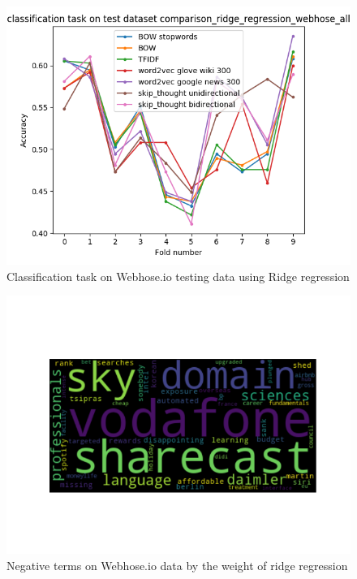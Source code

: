 \documentclass[sigconf]{acmart}
\begin{document}
\begin{figure}
  \includegraphics[width=\linewidth]{../../picture/experiment/classification_test_comparison_ridge_regression_webhose_all.png}
  \caption{Classification task on Webhose.io testing data using Ridge regression}
  \label{fig:web_cls_all}
\end{figure}

\begin{figure}
  \includegraphics[width=\linewidth]{../../picture/wordCloud/ridge_regression_negative_(webhose,_bow_noun,_verb_and_adj).png}
  \caption{Negative terms on Webhose.io data by the weight of ridge regression}
  \label{fig:web_neg_rid}
\end{figure}
\end{document}
